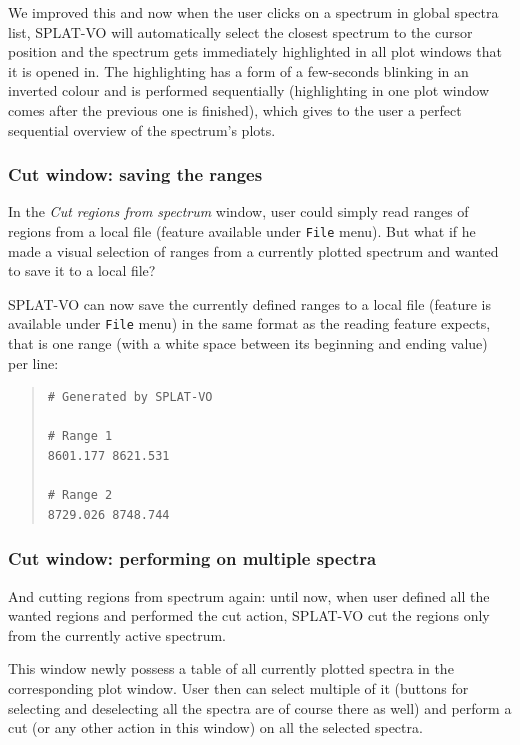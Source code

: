 \documentclass[final,authoryear,5p,times,twocolumn]{elsarticle}
\begin{document}
We improved this and now when the user clicks on a spectrum in global spectra
list, SPLAT-VO will automatically select the closest spectrum to the cursor
position and  the spectrum gets immediately highlighted in all plot windows
that it is opened in. The highlighting has a form of a few-seconds blinking in
an inverted colour and is performed sequentially (highlighting in one plot
window comes after the previous one is finished), which gives to the user a
perfect sequential overview of the spectrum's plots.

\subsubsection{Cut window: saving the ranges}

In the \emph{Cut regions from spectrum} window, user could simply read
ranges of regions from a local file (feature available under \texttt{File}
menu). But what if he made a visual selection of ranges from a
currently plotted spectrum and wanted to save it to a local file?

SPLAT-VO can now save the currently defined
ranges to a local file (feature is available under \texttt{File} menu) in the
same format as the reading feature expects, that is one range (with a
white space between its beginning and ending value) per line:

\begin{quote}
\small
\begin{verbatim}
# Generated by SPLAT-VO

# Range 1
8601.177 8621.531

# Range 2
8729.026 8748.744
\end{verbatim}
\end{quote}

\subsubsection{Cut window: performing on multiple spectra}

And cutting regions from spectrum again: until now, when user defined
all the wanted regions and performed the cut action, SPLAT-VO cut the
regions only from the currently active spectrum.

This window newly possess a table of all
currently plotted spectra in the corresponding plot window. User then
can select multiple of it (buttons for selecting and deselecting all
the spectra are of course there as well) and perform a cut (or any
other action in this window) on all the selected spectra.
\end{document}
